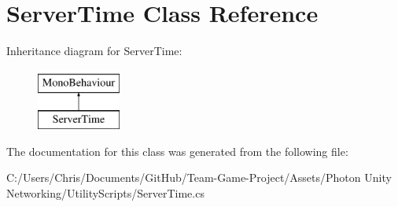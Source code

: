 \hypertarget{class_server_time}{}\section{Server\+Time Class Reference}
\label{class_server_time}
Inheritance diagram for Server\+Time\+:\begin{figure}[H]
\begin{center}
\leavevmode
\includegraphics[height=2.000000cm]{class_server_time}
\end{center}
\end{figure}


The documentation for this class was generated from the following file\+:\begin{DoxyCompactItemize}
\item 
C\+:/\+Users/\+Chris/\+Documents/\+Git\+Hub/\+Team-\/\+Game-\/\+Project/\+Assets/\+Photon Unity Networking/\+Utility\+Scripts/Server\+Time.\+cs\end{DoxyCompactItemize}
